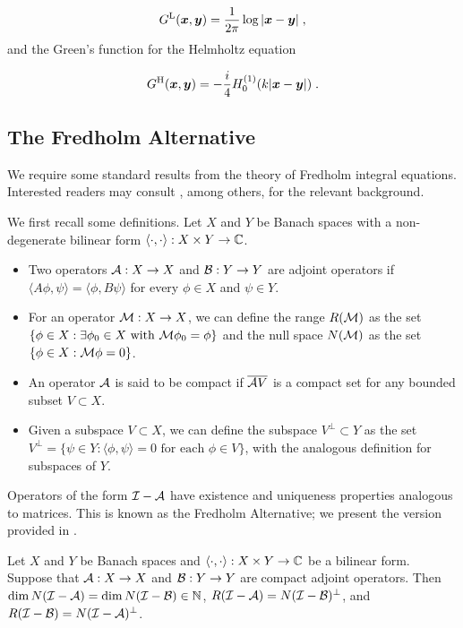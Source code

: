 \begin{equation}
  G^{\textrm{L}}({\boldsymbol x},{\boldsymbol y}) = \frac{1}{2\pi} \log |{\boldsymbol x}-{\boldsymbol y}| \; , \nonumber
\end{equation}
and the Green's function for the Helmholtz equation

\begin{equation}
  G^{\textrm{H}}({\boldsymbol x},{\boldsymbol y}) = -\frac{i}{4} H_0^{(1)}(k|{\boldsymbol x}-{\boldsymbol y}|) \; . \nonumber
\end{equation}

\subsection{The Fredholm Alternative}

We require some standard results from the theory of
Fredholm integral equations. Interested readers may
consult \cite{reed1972methods,colton1983integral,kress1989linear},
among others, for the relevant background.

We first recall some definitions.
Let $X$ and $Y$ be Banach spaces with a non-degenerate
bilinear form $\langle \cdot ,\cdot \rangle: X\times Y \to \mathbb{C}$.
\begin{itemize}
\item Two operators ${\mathcal A}:X\to X$ and ${\mathcal B}:Y\to Y$ are
adjoint operators if
$\langle A \phi,\psi \rangle = \langle \phi, B\psi \rangle$
for every $\phi \in X$ and $\psi \in Y$.
\item For an operator ${\mathcal M}:X\to X$, we can define the range
  $R({\mathcal M})$ as the set {\color{red}$\{\phi \in X: \exists \phi_0 \in X
  \textrm{ with }
  {\mathcal M}\phi_0 = \phi\}$} and the null space $N({\mathcal M})$ as the
  set $\{\phi \in X: {\mathcal M} \phi = 0 \}$.
\item An operator ${\mathcal A}$ is said to be compact if
  $\overline{{\mathcal A} V}$ is a compact set for any
  bounded subset $V\subset X$.
\item Given a subspace $V\subset X$,
  we can define the subspace $V^\perp\subset Y$ as the
  set $V^\perp = \{ \psi \in Y: \langle \phi,\psi \rangle = 0
  \textrm{ for each } \phi \in V \}$, with the analogous
  definition for subspaces of $Y$.
\end{itemize}

Operators of the form $\mathcal I-{\mathcal A}$
have existence and uniqueness properties analogous to
matrices. This is known as the Fredholm Alternative;
we present the version provided in \cite{colton1983integral}.

\begin{theorem}
  Let $X$ and $Y$ be Banach spaces and
  $\langle \cdot,\cdot \rangle: X\times Y \to \mathbb{C}$ be
  a bilinear form. Suppose that ${\mathcal A}: X\to X$ and
  ${\mathcal B}:Y \to Y$ are compact adjoint operators. Then
  $\dim N(\mathcal I-{\mathcal A}) = \dim N(\mathcal I-{\mathcal B}) \in \mathbb{N}$,
  $R(\mathcal I-{\mathcal A}) = N(\mathcal I-{\mathcal B})^{\perp}$, and
  $R(\mathcal I-{\mathcal B}) = N(\mathcal I-{\mathcal A})^\perp$.
\end{theorem}


